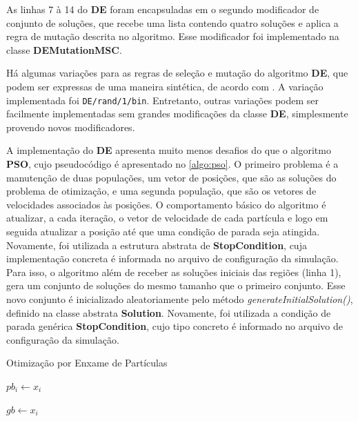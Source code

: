 As linhas 7 à 14 do \textbf{DE} foram encapsuladas em o segundo modificador de conjunto de soluções, que recebe uma lista contendo quatro soluções e aplica a regra de mutação descrita no algoritmo. Esse modificador foi implementado na classe  \textbf{DEMutationMSC}. 

Há algumas variações para as regras de seleção e mutação do algoritmo \textbf{DE}, que podem ser expressas de uma maneira sintética, de acordo com . A variação implementada foi \texttt{DE/rand/1/bin}.
Entretanto, outras variações podem ser facilmente implementadas sem grandes modificações da classe \textbf{DE}, simplesmente provendo novos modificadores.

A implementação do \textbf{DE} apresenta muito menos desafios do que o algoritmo \textbf{PSO}, cujo pseudocódigo é apresentado no \autoref{algo:pso}. O primeiro problema é a manutenção de duas populações, um vetor de posições, que são as soluções do problema de otimização, e uma segunda população, que são os vetores de velocidades associados às posições. O comportamento básico do algoritmo é atualizar, a cada iteração, o vetor de velocidade de cada partícula e logo em seguida atualizar a posição até que uma condição de parada seja atingida. Novamente, foi utilizada a estrutura abstrata de \textbf{StopCondition}, cuja implementação concreta é informada no arquivo de configuração da simulação. Para isso, o algoritmo além de receber as soluções iniciais das regiões (linha 1), gera um conjunto de soluções do mesmo tamanho que o primeiro conjunto. Esse novo conjunto é inicializado aleatoriamente pelo método \textit{generateInitialSolution()}, definido na classe abstrata \textbf{Solution}. Novamente, foi utilizada a condição de parada genérica \textbf{StopCondition}, cujo tipo concreto é informado no arquivo de configuração da simulação. 

\begin{algorithm}[H]
\caption{Otimização por Enxame de Partículas}
\label{algo:pso}
\begin{algorithmic}[1]
    \State {} 
    \State {}
    
                \State $pb_i \gets x_i$ 
            \EndIf
            
                \State $gb \gets x_i$
            \EndIf
        \EndFor
    
            \EndFor
        \EndFor
    \EndWhile
\end{algorithmic}
\end{algorithm}

